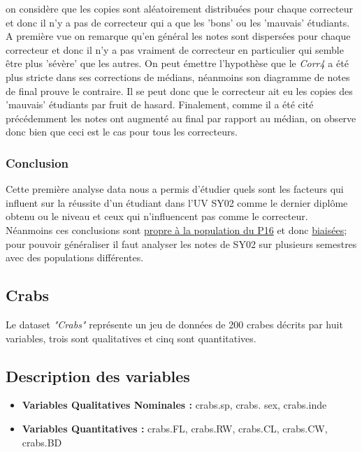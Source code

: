 \documentclass[10pt]{article}
\begin{document}
	on considère que les copies sont aléatoirement distribuées pour chaque correcteur et donc il n'y a pas de correcteur qui a que les 'bons' ou les 'mauvais' étudiants. A première vue on remarque qu'en général les notes sont dispersées pour chaque correcteur et donc il n'y a pas vraiment de correcteur en particulier qui semble être plus 'sévère' que les autres. On peut émettre l'hypothèse que le \textit{Corr4} a été plus stricte dans ses corrections de médians, néanmoins son diagramme de notes de final prouve le contraire. Il se peut donc que le correcteur ait eu les copies des 'mauvais' étudiants par fruit de hasard. Finalement, comme il a été cité précédemment les notes ont augmenté au final par rapport au médian, on observe donc bien que ceci est le cas pour tous les correcteurs.
	
	\subsubsection{Conclusion}
	Cette première analyse data nous a permis d'étudier quels sont les facteurs qui influent sur la réussite d'un étudiant dans l'UV SY02 comme le dernier diplôme obtenu ou le niveau et ceux qui n'influencent pas comme le correcteur. Néanmoins ces conclusions sont \underline{propre à la population du P16} et donc  \underline{biaisées}; pour pouvoir généraliser il faut analyser les notes de SY02 sur plusieurs semestres avec des populations différentes.
	
	\subsection{Crabs}
	Le dataset \textit{"Crabs"} représente un jeu de données de 200 crabes décrits par huit variables, trois sont qualitatives et cinq sont quantitatives.
	
	\subsection{Description des variables}
	
	
	\begin{itemize}
		\item \textbf{Variables Qualitatives Nominales :}  crabs.sp, crabs. sex, crabs.inde
		\item \textbf{Variables Quantitatives : } crabs.FL, crabs.RW, crabs.CL, crabs.CW, crabs.BD
	\end{itemize}
	
\end{document}
